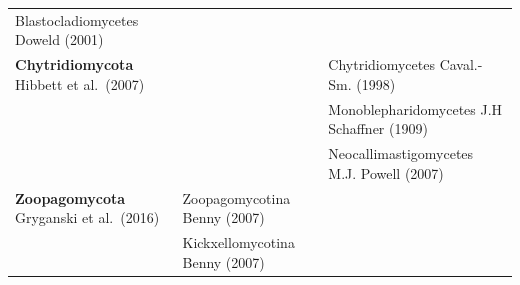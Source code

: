 \documentclass[]{book}
\begin{document}
\begin{longtable}[]{@{}lll@{}}
\begin{minipage}[t]{0.31\columnwidth}
Blastocladiomycetes Doweld (2001)\strut
\end{minipage}\tabularnewline
\begin{minipage}[t]{0.32\columnwidth}\raggedright
\textbf{Chytridiomycota} Hibbett et al.~(2007)\strut
\end{minipage} & \begin{minipage}[t]{0.28\columnwidth}\raggedright
\strut
\end{minipage} & \begin{minipage}[t]{0.31\columnwidth}\raggedright
Chytridiomycetes Caval.-Sm. (1998)\strut
\end{minipage}\tabularnewline
\begin{minipage}[t]{0.32\columnwidth}\raggedright
\strut
\end{minipage} & \begin{minipage}[t]{0.28\columnwidth}\raggedright
\strut
\end{minipage} & \begin{minipage}[t]{0.31\columnwidth}\raggedright
Monoblepharidomycetes J.H Schaffner (1909)\strut
\end{minipage}\tabularnewline
\begin{minipage}[t]{0.32\columnwidth}\raggedright
\strut
\end{minipage} & \begin{minipage}[t]{0.28\columnwidth}\raggedright
\strut
\end{minipage} & \begin{minipage}[t]{0.31\columnwidth}\raggedright
Neocallimastigomycetes M.J. Powell (2007)\strut
\end{minipage}\tabularnewline
\begin{minipage}[t]{0.32\columnwidth}\raggedright
\textbf{Zoopagomycota} Gryganski et al.~(2016)\strut
\end{minipage} & \begin{minipage}[t]{0.28\columnwidth}\raggedright
Zoopagomycotina Benny (2007)\strut
\end{minipage} & \begin{minipage}[t]{0.31\columnwidth}\raggedright
\strut
\end{minipage}\tabularnewline
\begin{minipage}[t]{0.32\columnwidth}\raggedright
\strut
\end{minipage} & \begin{minipage}[t]{0.28\columnwidth}\raggedright
Kickxellomycotina Benny (2007)\strut
\end{minipage} & \begin{minipage}[t]{0.31\columnwidth}\raggedright

\end{minipage}
\end{longtable}
\end{document}
